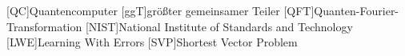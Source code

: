 \begin{acronym}
  [QC]{Quantencomputer}
  [ggT]{größter gemeinsamer Teiler}
  [QFT]{Quanten-Fourier-Transformation}
  [NIST]{National Institute of Standards and Technology}
  [LWE]{Learning With Errors}
  [SVP]{Shortest Vector Problem}
\end{acronym}
